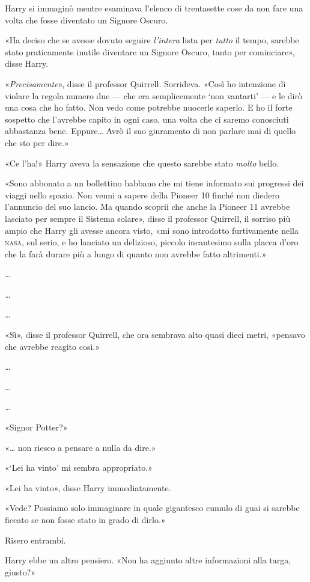 Harry si immaginò mentre esaminava l’elenco di trentasette cose da non fare una volta che fosse diventato un Signore Oscuro.

«Ha deciso che se avesse dovuto seguire \textit{l’intera} lista per \textit{tutto} il tempo, sarebbe stato praticamente inutile diventare un Signore Oscuro, tanto per cominciare», disse Harry.

«\textit{Precisamente}», disse il professor Quirrell. Sorrideva. «Così ho intenzione di violare la regola numero due — che era semplicemente ‘non vantarti’ — e le dirò una cosa che ho fatto. Non vedo come potrebbe nuocerle saperlo. E ho il forte sospetto che l’avrebbe capito in ogni caso, una volta che ci saremo conosciuti abbastanza bene. Eppure… Avrò il suo giuramento di non parlare mai di quello che sto per dire.»

«Ce l’ha!» Harry aveva la sensazione che questo sarebbe stato \textit{molto} bello.

«Sono abbonato a un bollettino babbano che mi tiene informato sui progressi dei viaggi nello spazio. Non venni a sapere della Pioneer 10 finché non diedero l’annuncio del suo lancio. Ma quando scoprii che anche la Pioneer 11 avrebbe lasciato per sempre il Sistema solare», disse il professor Quirrell, il sorriso più ampio che Harry gli avesse ancora visto, «mi sono introdotto furtivamente nella \textsc{nasa}, sul serio, e ho lanciato un delizioso, piccolo incantesimo sulla placca d’oro che la farà durare più a lungo di quanto non avrebbe fatto altrimenti.»

…

…

…

«Sì», disse il professor Quirrell, che ora sembrava alto quasi dieci metri, «pensavo che avrebbe reagito così.»

…

…

…

«Signor Potter?»

«… non riesco a pensare a nulla da dire.»

«‘Lei ha vinto’ mi sembra appropriato.»

«Lei ha vinto», disse Harry immediatamente.

«Vede? Possiamo solo immaginare in quale gigantesco cumulo di guai si sarebbe ficcato se non fosse stato in grado di dirlo.»

Risero entrambi.

Harry ebbe un altro pensiero. «Non ha aggiunto altre informazioni alla targa, giusto?»

